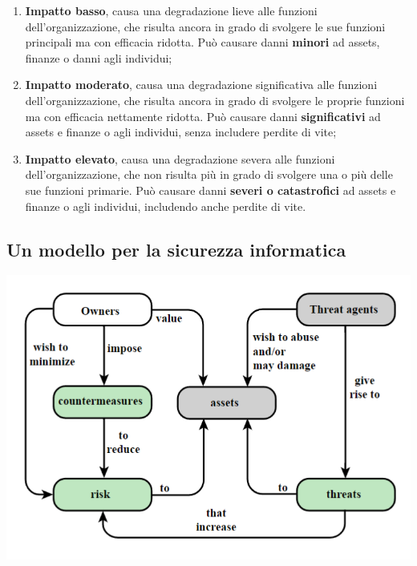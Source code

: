 \documentclass[14pt]{extarticle}
\begin{document}
\begin{enumerate}
    
    \item \textbf{Impatto basso}, causa una degradazione lieve alle funzioni \\
    dell'organizzazione, che risulta ancora in grado di svolgere le sue funzioni
    principali ma con efficacia ridotta. Può causare danni \textbf{minori} ad
    assets, finanze o danni agli individui;
    \item \textbf{Impatto moderato}, causa una degradazione significativa alle
    funzioni dell'organizzazione, che risulta ancora in grado di svolgere le
    proprie funzioni ma con efficacia nettamente ridotta. Può causare danni
    \textbf{significativi} ad assets e finanze o agli individui, senza includere
    perdite di vite;
    \item \textbf{Impatto elevato}, causa una degradazione severa alle funzioni
    dell'organizzazione, che non risulta più in grado di svolgere una o più
    delle sue funzioni primarie. Può causare danni \textbf{severi o
    catastrofici} ad assets e finanze o agli individui, includendo anche perdite
    di vite. 

\end{enumerate}

\subsection{Un modello per la sicurezza informatica}

\begin{center}
    \includegraphics[scale=0.78]{images/modello.png}
\end{center}
\end{document}
